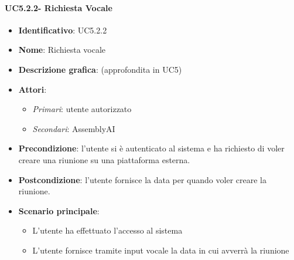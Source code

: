 \paragraph{UC5.2.2- Richiesta Vocale}
\begin{itemize}
   \item \textbf{Identificativo}: UC5.2.2
   \item \textbf{Nome}: Richiesta vocale
   \item \textbf{Descrizione grafica}: (approfondita in UC5)
   \item \textbf{Attori}:
   \begin{itemize} 
       \item \textit{Primari}: utente autorizzato
       \item \textit{Secondari}: AssemblyAI
   \end{itemize}
       \item \textbf{Precondizione}: l'utente si è autenticato al sistema e ha richiesto di voler creare una riunione su una piattaforma esterna.
       \item \textbf{Postcondizione}: l'utente fornisce la data per quando voler creare la riunione.
    \item \textbf{Scenario principale}: 
       \begin{itemize}
           \item L'utente ha effettuato l'accesso al sistema 
           \item L'utente fornisce tramite input vocale la data in cui avverrà la riunione
       \end{itemize}
\end{itemize}

